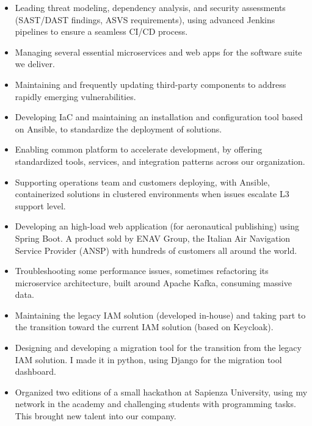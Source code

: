 	\medskip

	\newline
	\begin{itemize}
		\item Leading threat modeling, dependency analysis, and security assessments (SAST/DAST findings, ASVS requirements), using advanced Jenkins pipelines to ensure a seamless CI/CD process.
		\item Managing several essential microservices and web apps for the software suite we deliver.
		\item Maintaining and frequently updating third-party components to address rapidly emerging vulnerabilities.
		\item  Developing IaC and maintaining an installation and configuration tool based on Ansible, to standardize the deployment of solutions.
		\item Enabling common platform to accelerate development, by offering standardized tools, services, and integration patterns across our organization.
		\item Supporting operations team and customers deploying, with Ansible, containerized solutions in clustered environments when issues escalate L3 support level.
	\end{itemize}
	\smallskip

	\medskip

	\newline
	\begin{itemize}
		\item Developing an high-load web application (for aeronautical publishing) using Spring Boot. A product sold by ENAV Group, the Italian Air Navigation Service Provider (ANSP) with hundreds of customers all around the world.
		\item Troubleshooting some performance issues, sometimes refactoring its microservice architecture, built around Apache Kafka, consuming massive data.
		\item Maintaining the legacy IAM solution (developed in-house) and taking part to the transition toward the current IAM solution (based on Keycloak).
		\item Designing and developing a migration tool for the transition from the legacy IAM solution. I made it in python, using Django for the migration tool dashboard.
		\item Organized two editions of a small hackathon at Sapienza University, using my network in the academy and challenging students with programming tasks. This brought new talent into our company.
	\end{itemize}
	\smallskip


